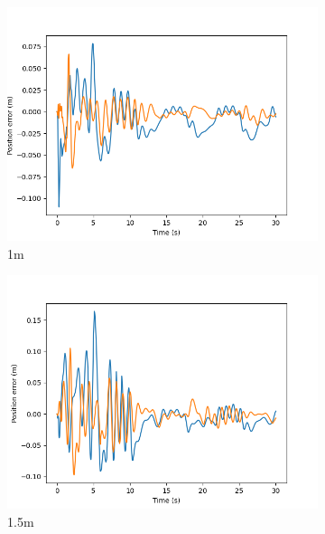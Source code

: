 \documentclass[class=article, crop=false]{standalone}
\begin{document}
\begin{figure}
\begin{subfigure}[b]{0.48\textwidth}
        \label{}
    \end{subfigure}
    \vfill
    \begin{subfigure}[b]{0.48\textwidth}
        \centering
        \includegraphics{scenario1/rov-0m/1.0m/rov_position_error_uncontrolled}
        \caption{1m}
        \label{}
    \end{subfigure}
    \hfill
    \begin{subfigure}[b]{0.48\textwidth}
        \centering
        \includegraphics{scenario1/rov-0m/1.5m/rov_position_error_uncontrolled}
        \caption{1.5m}
        \label{}
    \end{subfigure}
    \vfill
    \begin{subfigure}[b]{0.48\textwidth}

\end{subfigure}
\end{figure}
\end{document}
